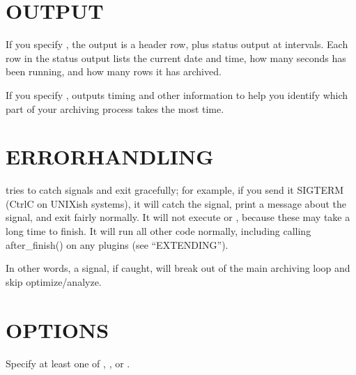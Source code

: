 \documentclass[letterpaper,10pt,english]{sphinxmanual}
\begin{document}
\section{OUTPUT}
\label{\detokenize{mariadb-archiver:output}}
If you specify {\hyperref[\detokenize{mariadb-archiver:cmdoption-mariadb-archiver-progress}]{}}, the output is a header row, plus status output
at intervals.  Each row in the status output lists the current date and time,
how many seconds  has been running, and how many rows it has
archived.

If you specify {\hyperref[\detokenize{mariadb-archiver:cmdoption-mariadb-archiver-statistics}]{}},  outputs timing and other
information to help you identify which part of your archiving process takes the
most time.


\section{ERROR\sphinxhyphen{}HANDLING}
\label{\detokenize{mariadb-archiver:error-handling}}
 tries to catch signals and exit gracefully; for example, if you
send it SIGTERM (Ctrl\sphinxhyphen{}C on UNIX\sphinxhyphen{}ish systems), it will catch the signal, print a
message about the signal, and exit fairly normally.  It will not execute
{\hyperref[\detokenize{mariadb-archiver:cmdoption-mariadb-archiver-analyze}]{}} or {\hyperref[\detokenize{mariadb-archiver:cmdoption-mariadb-archiver-optimize}]{}}, because these may take a long time to finish.
It will run all other code normally, including calling after\_finish() on any
plugins (see “EXTENDING”).

In other words, a signal, if caught, will break out of the main archiving
loop and skip optimize/analyze.


\section{OPTIONS}
\label{\detokenize{mariadb-archiver:options}}
Specify at least one of {\hyperref[\detokenize{mariadb-archiver:cmdoption-mariadb-archiver-dest}]{}}, {\hyperref[\detokenize{mariadb-archiver:cmdoption-mariadb-archiver-file}]{}}, or {\hyperref[\detokenize{mariadb-archiver:cmdoption-mariadb-archiver-purge}]{}}.
\end{document}
